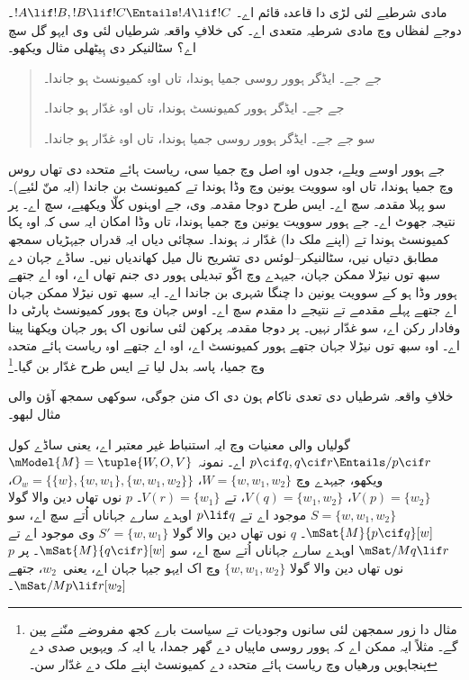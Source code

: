 \documentclass[../../../include/open-logic-section]{subfiles}
\begin{document}


مادی شرطیے لئی لڑی دا قاعدہ قائم اے۔ $!A \lif !B, !B \lif !C \Entails !A \lif !C$۔
دوجے لفظاں وچ مادی شرطیہ متعدی اے۔ کی خلافِ واقعہ شرطیاں لئی وی ایہو گل سچ اے؟
سٹالنیکر دی ہِیٹھلی مثال ویکھو۔
\begin{quote}
  جے جے۔ ایڈگر ہوور روسی جمیا ہوندا، تاں اوہ کمیونسٹ ہو جاندا۔

  جے جے۔ ایڈگر ہوور کمیونسٹ ہوندا، تاں اوہ غدّار ہو جاندا۔

  سو جے جے۔ ایڈگر ہوور روسی جمیا ہوندا، تاں اوہ غدّار ہو جاندا۔
\end{quote}
جے ہوور اوسے ویلے، جدوں اوہ اصل وچ جمیا سی، ریاست ہائے متحدہ دی تھاں روس
وچ جمیا ہوندا، تاں اوہ سوویت یونین وچ وڈا ہوندا تے کمیونسٹ بن جاندا
(ایہ منّ لئیے)۔ سو پہلا مقدمہ سچ اے۔ ایس طرح دوجا مقدمہ وی، جے اوہنوں
کلّا ویکھیے، سچ اے۔ پر نتیجہ جھوٹ اے۔ جے ہوور سوویت یونین وچ جمیا ہوندا،
تاں وڈا امکان ایہ سی کہ اوہ پکا کمیونسٹ ہوندا تے (اپنے ملک دا) غدّار نہ ہوندا۔
سچائی دیاں ایہ قدراں جیہڑیاں سمجھ مطابق دتیاں نیں، سٹالنیکر--لوئس دی تشریح نال
میل کھاندیاں نیں۔ ساڈے جہان دے سبھ توں نیڑلا ممکن جہان، جیہدے وچ اکّو تبدیلی
ہوور دی جنم تھاں اے، اوہ اے جتھے ہوور وڈا ہو کے سوویت یونین دا چنگا شہری
بن جاندا اے۔ ایہ سبھ توں نیڑلا ممکن جہان اے جتھے پہلے مقدمے تے نتیجے دا
مقدم سچ اے۔ اوس جہان وچ ہوور کمیونسٹ پارٹی دا وفادار رکن اے، سو غدّار نہیں۔
پر دوجا مقدمہ پرکھن لئی سانوں اک ہور جہان ویکھنا پینا اے۔ اوہ سبھ توں نیڑلا
جہان جتھے ہوور کمیونسٹ اے، اوہ اے جتھے اوہ ریاست ہائے متحدہ وچ جمیا، پاسہ
بدل لیا تے ایس طرح غدّار بن گیا۔\footnote{مثال دا زور سمجھن لئی سانوں
  وجودیات تے سیاست بارے کجھ مفروضے منّنے پین گے۔ مثلاً ایہ ممکن اے کہ
  ہوور روسی ماپیاں دے گھر جمدا، یا ایہ کہ ویہویں صدی دے پنجاہویں ورھیاں وچ
  ریاست ہائے متحدہ دے کمیونسٹ اپنے ملک دے غدّار سن۔}

\begin{prob}
  خلافِ واقعہ شرطیاں دی تعدی ناکام ہون دی اک منن جوگی، سوکھی سمجھ آؤن والی مثال لبھو۔
\end{prob}

\begin{ex}
  گولیاں والی معنیات وچ ایہ استنباط غیر معتبر اے، یعنی ساڈے کول $p
  \cif q, q \cif r \Entails/ p \cif r$ اے۔ نمونہ $\mModel{M}
  = \tuple{W, O, V}$ ویکھو، جیہدے وچ $W = \{w, w_1, w_2\}$،
  $O_w = \{\{w\}, \{w, w_1\}, \{w, w_1, w_2\}\}$، $V(p) = \{w_2\}$،
  $V(q) = \{w_1, w_2\}$، تے $V(r) = \{w_1\}$۔ $p$ نوں تھاں دین والا
  گولا $S = \{w, w_1, w_2\}$ موجود اے تے $p \lif q$ اوہدے سارے جہاناں
  اُتے سچ اے، سو $\mSat{M}{p \cif q}[w]$۔ $q$ نوں تھاں دین والا گولا
  $S' = \{w, w_1\}$ وی موجود اے تے $\mSat/{M}{q \lif r}$ اوہدے سارے جہاناں
  اُتے سچ اے، سو $\mSat{M}{q \cif r}[w]$۔ پر $p$ نوں تھاں دین والا گولا
  $\{w, w_1, w_2\}$ وچ اک ایہو جیہا جہان اے، یعنی~$w_2$، جتھے
  $\mSat/{M}{p \lif r}[w_2]$۔
\end{ex}
\end{document}
